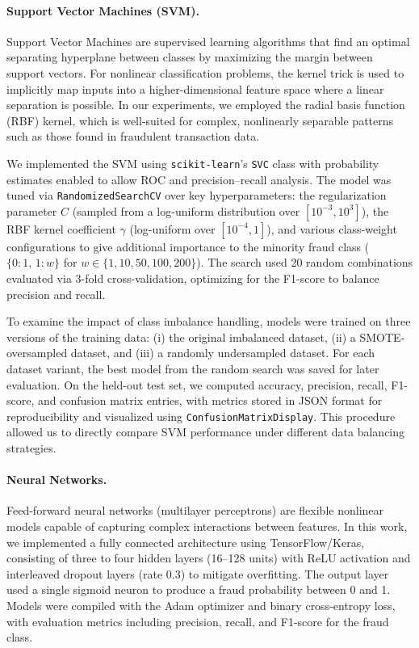 \documentclass{article}
\begin{document}
    \paragraph{Support Vector Machines (SVM).}
Support Vector Machines are supervised learning algorithms that find an optimal separating hyperplane between classes by maximizing the margin between support vectors. For nonlinear classification problems, the kernel trick is used to implicitly map inputs into a higher-dimensional feature space where a linear separation is possible. In our experiments, we employed the radial basis function (RBF) kernel, which is well-suited for complex, nonlinearly separable patterns such as those found in fraudulent transaction data.

We implemented the SVM using \texttt{scikit-learn}'s \texttt{SVC} class with probability estimates enabled to allow ROC and precision–recall analysis. The model was tuned via \texttt{RandomizedSearchCV} over key hyperparameters: the regularization parameter $C$ (sampled from a log-uniform distribution over $[10^{-3}, 10^{3}]$), the RBF kernel coefficient $\gamma$ (log-uniform over $[10^{-4}, 1]$), and various class-weight configurations to give additional importance to the minority fraud class ($\{0:1,\, 1:w\}$ for $w \in \{1, 10, 50, 100, 200\}$). The search used 20 random combinations evaluated via 3-fold cross-validation, optimizing for the F1-score to balance precision and recall.

To examine the impact of class imbalance handling, models were trained on three versions of the training data: (i) the original imbalanced dataset, (ii) a SMOTE-oversampled dataset, and (iii) a randomly undersampled dataset. For each dataset variant, the best model from the random search was saved for later evaluation. On the held-out test set, we computed accuracy, precision, recall, F1-score, and confusion matrix entries, with metrics stored in JSON format for reproducibility and visualized using \texttt{ConfusionMatrixDisplay}. This procedure allowed us to directly compare SVM performance under different data balancing strategies.

    \paragraph{Neural Networks.}
Feed-forward neural networks (multilayer perceptrons) are flexible nonlinear models capable of capturing complex interactions between features. In this work, we implemented a fully connected architecture using TensorFlow/Keras, consisting of three to four hidden layers (16–128 units) with ReLU activation and interleaved dropout layers (rate 0.3) to mitigate overfitting. The output layer used a single sigmoid neuron to produce a fraud probability between 0 and 1. Models were compiled with the Adam optimizer and binary cross-entropy loss, with evaluation metrics including precision, recall, and F1-score for the fraud class.
\end{document}
